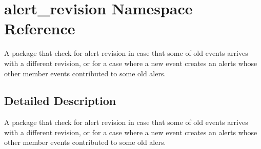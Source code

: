 \hypertarget{namespacealert__revision}{\section{alert\-\_\-revision Namespace Reference}
\label{namespacealert__revision}
}


A package that check for alert revision in case that some of old events arrives with a different revision, or for a case where a new event creates an alerts whose other member events contributed to some old alers.  




\subsection{Detailed Description}
A package that check for alert revision in case that some of old events arrives with a different revision, or for a case where a new event creates an alerts whose other member events contributed to some old alers. 
